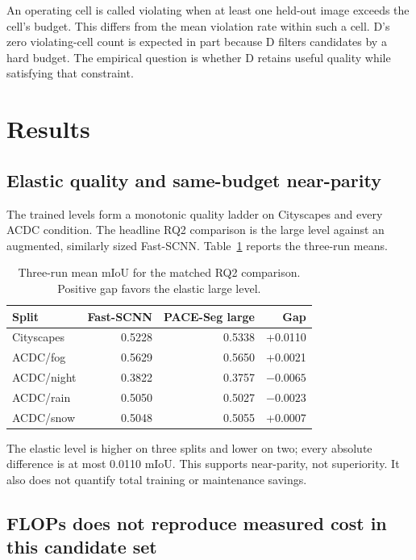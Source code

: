 \documentclass[a4paper,review,12pt]{elsarticle}
\newcommand{\method}{PACE-Seg}
\newcommand{\miou}{mIoU}
\begin{document}
An operating cell is called violating when at least one held-out image exceeds the cell's budget. This differs from the mean violation rate within such a cell. D's zero violating-cell count is expected in part because D filters candidates by a hard budget. The empirical question is whether D retains useful quality while satisfying that constraint.

\section{Results}
\label{sec:results}

\subsection{Elastic quality and same-budget near-parity}

The trained levels form a monotonic quality ladder on Cityscapes and every ACDC condition. The headline RQ2 comparison is the large level against an augmented, similarly sized Fast-SCNN. Table~\ref{tab:rq2} reports the three-run means.

\begin{table}[t]
\centering
\caption{Three-run mean \miou{} for the matched RQ2 comparison. Positive gap favors the elastic large level.}
\label{tab:rq2}
\begin{tabular}{@{}lrrr@{}}
\toprule
Split & Fast-SCNN & \method{} large & Gap \\
\midrule
Cityscapes & 0.5228 & 0.5338 & +0.0110 \\
ACDC/fog & 0.5629 & 0.5650 & +0.0021 \\
ACDC/night & 0.3822 & 0.3757 & $-0.0065$ \\
ACDC/rain & 0.5050 & 0.5027 & $-0.0023$ \\
ACDC/snow & 0.5048 & 0.5055 & +0.0007 \\
\bottomrule
\end{tabular}
\end{table}

The elastic level is higher on three splits and lower on two; every absolute difference is at most 0.0110 \miou{}. This supports near-parity, not superiority. It also does not quantify total training or maintenance savings.

\subsection{FLOPs does not reproduce measured cost in this candidate set}
\end{document}
